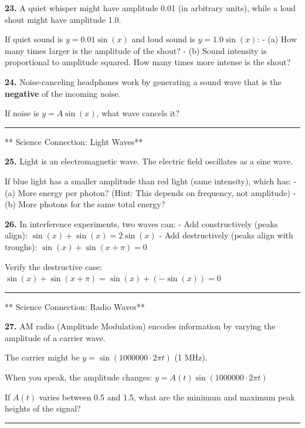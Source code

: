 \documentclass[
  11pt,
]{article}
\begin{document}
\textbf{23.} A quiet whisper might have amplitude 0.01 (in arbitrary
units), while a loud shout might have amplitude 1.0.

If quiet sound is \(y = 0.01\sin(x)\) and loud sound is
\(y = 1.0\sin(x)\): - (a) How many times larger is the amplitude of the
shout? - (b) Sound intensity is proportional to amplitude squared. How
many times more intense is the shout?

\textbf{24.} Noise-canceling headphones work by generating a sound wave
that is the \textbf{negative} of the incoming noise.

If noise is \(y = A\sin(x)\), what wave cancels it?

\begin{center}\rule{0.5\linewidth}{0.5pt}\end{center}

** Science Connection: Light Waves**

\textbf{25.} Light is an electromagnetic wave. The electric field
oscillates as a sine wave.

If blue light has a smaller amplitude than red light (same intensity),
which has: - (a) More energy per photon? (Hint: This depends on
frequency, not amplitude) - (b) More photons for the same total energy?

\textbf{26.} In interference experiments, two waves can: - Add
constructively (peaks align): \(\sin(x) + \sin(x) = 2\sin(x)\) - Add
destructively (peaks align with troughs):
\(\sin(x) + \sin(x + \pi) = 0\)

Verify the destructive case:
\(\sin(x) + \sin(x + \pi) = \sin(x) + (-\sin(x)) = 0\)

\begin{center}\rule{0.5\linewidth}{0.5pt}\end{center}

** Science Connection: Radio Waves**

\textbf{27.} AM radio (Amplitude Modulation) encodes information by
varying the amplitude of a carrier wave.

The carrier might be \(y = \sin(1000000 \cdot 2\pi t)\) (1 MHz).

When you speak, the amplitude changes:
\(y = A(t)\sin(1000000 \cdot 2\pi t)\)

If \(A(t)\) varies between 0.5 and 1.5, what are the minimum and maximum
peak heights of the signal?

\begin{center}\rule{0.5\linewidth}{0.5pt}\end{center}
\end{document}
